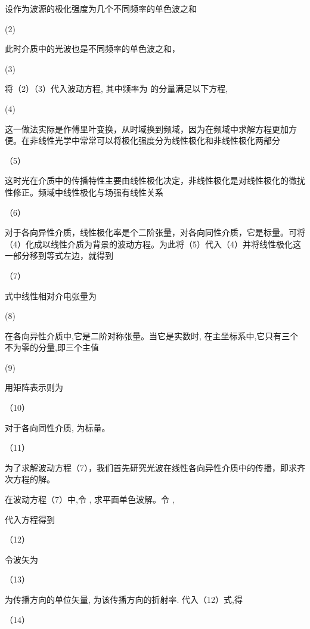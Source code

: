 设作为波源的极化强度为几个不同频率的单色波之和

                                               (2)           

此时介质中的光波也是不同频率的单色波之和，

                                             (3)    

将（2）（3）代入波动方程, 其中频率为 的分量满足以下方程,

                            (4)

这一做法实际是作傅里叶变换，从时域换到频域，因为在频域中求解方程更加方便。在非线性光学中常常可以将极化强度分为线性极化和非线性极化两部分

                               （5）

这时光在介质中的传播特性主要由线性极化决定，非线性极化是对线性极化的微扰性修正。频域中线性极化与场强有线性关系

                               （6）

对于各向异性介质，线性极化率是个二阶张量，对各向同性介质，它是标量。可将（4）化成以线性介质为背景的波动方程。为此将（5）代入（4）并将线性极化这一部分移到等式左边，就得到

            （7）

式中线性相对介电张量为

                                              (8)

在各向异性介质中,它是二阶对称张量。当它是实数时, 在主坐标系中,它只有三个不为零的分量,即三个主值

                                             (9)

用矩阵表示则为

                                      （10）   

对于各向同性介质, 为标量。

                                   （11）

为了求解波动方程（7），我们首先研究光波在线性各向异性介质中的传播，即求齐次方程的解。

在波动方程（7）中,令 , 求平面单色波解。令  ,

代入方程得到

                    （12）                

令波矢为

                                                   （13）

 为传播方向的单位矢量, 为该传播方向的折射率. 代入（12）式,得

                                 （14）              
                                 

